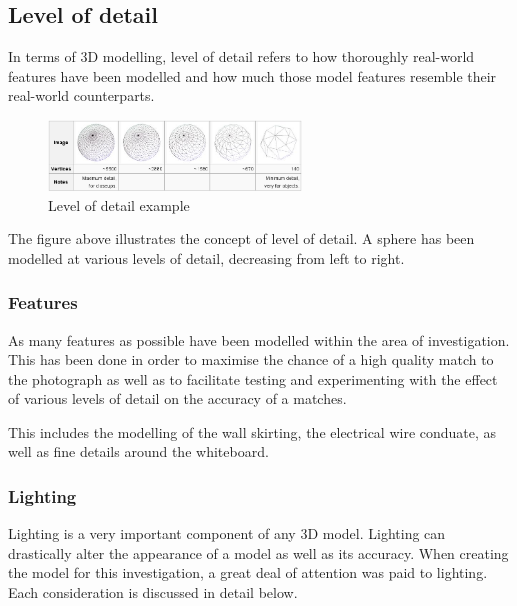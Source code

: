 \documentclass[11pt,a4paper]{report}
\begin{document}
		\subsection{Level of detail}
			In terms of 3D modelling, level of detail refers to how thoroughly real-world features have been modelled and how much those model features resemble their real-world counterparts.
			
			\begin{figure}[h!]
				\centering
				\includegraphics[width=0.6\textwidth]{level_of_detail_example}
				\caption{Level of detail example}
			\end{figure}
			
			The figure above illustrates the concept of level of detail. A sphere has been modelled at various levels of detail, decreasing from left to right.
			
			\subsubsection{Features}
				As many features as possible have been modelled within the area of investigation. This has been done in order to maximise the chance of a high quality match to the photograph as well as to facilitate testing and experimenting with the effect of various levels of detail on the accuracy of a matches. 
				
				
				This includes the modelling of the wall skirting, the electrical wire conduate, as well as fine details around the whiteboard. 
				
			
			\subsubsection{Lighting}
				Lighting is a very important component of any 3D model. Lighting can drastically alter the appearance of a model as well as its accuracy. When creating the model for this investigation, a great deal of attention was paid to lighting. Each consideration is discussed in detail below.
				
\end{document}
